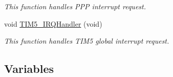 \begin{DoxyCompactItemize}
\begin{DoxyCompactList}\small\item\em This function handles P\-P\-P interrupt request. \end{DoxyCompactList}\item 
void \hyperlink{group___i_w_d_g___example_ga5e66446caf21dd90191dc07a13ce2378}{T\-I\-M5\-\_\-\-I\-R\-Q\-Handler} (void)
\begin{DoxyCompactList}\small\item\em This function handles T\-I\-M5 global interrupt request. \end{DoxyCompactList}\end{DoxyCompactItemize}
\subsection*{Variables}

